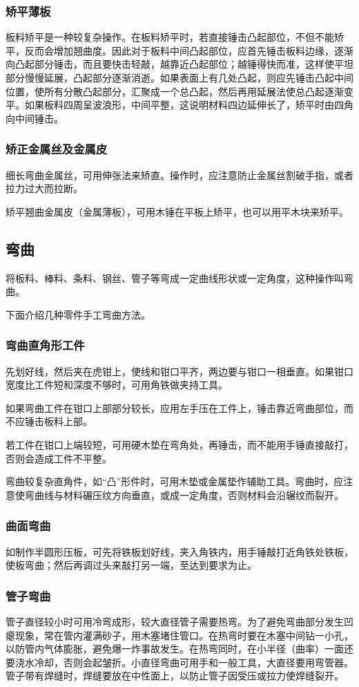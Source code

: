 \documentclass{ctexbook}
\begin{document}
\subsubsection{矫平薄板}
板料矫平是一种较复杂操作。在板料矫平时，若直接锤击凸起部位，不但不能矫平，反而会增加翘曲度。因此对于板料中间凸起部位，应首先锤击板料边缘，逐渐向凸起部分锤击，而且要快击轻敲，越靠近凸起部位；越锤得快而准，这样使平坦部分慢慢延展，凸起部分逐渐消逝。如果表面上有几处凸起，则应先锤击凸起中间位置，使所有分散凸起部分，汇聚成一个总凸起，然后再用延展法使总凸起逐渐变平。如果板料四周呈波浪形，中间平整，这说明材料四边延伸长了，矫平时由四角向中间锤击。
\subsubsection{矫正金属丝及金属皮}
细长弯曲金属丝，可用伸张法来矫直。操作时，应注意防止金属丝割破手指，或者拉力过大而拉断。

矫平翘曲金属皮（金属薄板），可用木锤在平板上矫平，也可以用平木块来矫平。
\subsection{弯曲}
将板料、棒料、条料、钢丝、管子等弯成一定曲线形状或一定角度，这种操作叫弯曲。

下面介绍几种零件手工弯曲方法。
\subsubsection{弯曲直角形工件}
先划好线，然后夹在虎钳上，使线和钳口平齐，两边要与钳口一相垂直。如果钳口宽度比工件短和深度不够时，可用角铁做夹持工具。

如果弯曲工件在钳口上部部分较长，应用左手压在工件上，锤击靠近弯曲部位，而不应锤击板料上部。

若工件在钳口上端较短，可用硬木垫在弯角处，再锤击，而不能用手锤直接敲打，否则会造成工件不平整。

弯曲较复杂直角件，如“凸”形件时，可用木垫或金属垫作辅助工具。弯曲时，应注意使弯曲线与材料碾压纹方向垂直，或成一定角度，否则材料会沿辗纹而裂开。
\subsubsection{曲面弯曲}
如制作半圆形压板，可先将铁板划好线，夹入角铁内，用手锤敲打近角铁处铁板，使板弯曲；然后再调过头来敲打另一端，至达到要求为止。
\subsubsection{管子弯曲}
管子直径较小时可用冷弯成形，较大直径管子需要热弯。为了避免弯曲部分发生凹瘪现象，常在管内灌满砂子，用木塞堵住管口。在热弯时要在木塞中间钻一小孔，以防管内气体膨胀，避免爆一炸事故发生。在热弯同时，在小半径（曲率）一面还要浇水冷却，否则会起皱折。小直径弯曲可用手和一般工具，大直径要用弯管器。管子带有焊缝时，焊缝要放在中性面上，以防止管子因受压或拉力使焊缝裂开。
\end{document}
